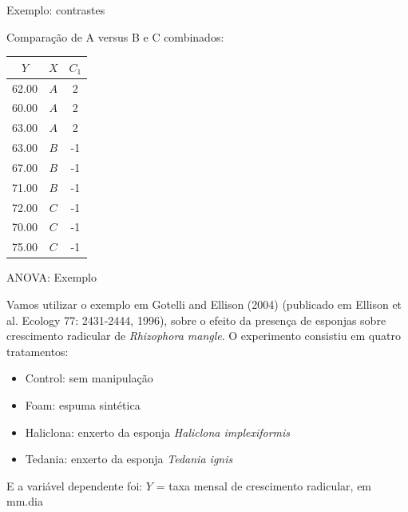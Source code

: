 \documentclass{beamer}\usepackage[]{graphicx}\usepackage[]{color}
\begin{document}
\begin{frame}{Exemplo: contrastes}

Comparação de A versus B e C combinados:

\begin{tabular}{cc|c}
  \hline
  $Y$ & $X$ & $C_1$  \\ 
  \hline
  62.00 & $A$ & 2 \\ 
  60.00 & $A$ & 2 \\ 
  63.00 & $A$ & 2 \\ 
  63.00 & $B$ & -1 \\ 
  67.00 & $B$ & -1 \\ 
  71.00 & $B$ & -1 \\ 
  72.00 & $C$ & -1\\ 
  70.00 & $C$ & -1\\ 
  75.00 & $C$ & -1\\ 
  \hline
\end{tabular}

\end{frame}


\begin{frame}{ANOVA: Exemplo}

Vamos utilizar o exemplo em Gotelli and Ellison (2004) (publicado em Ellison et al. Ecology 77: 2431-2444, 1996), sobre o efeito da presença de esponjas sobre crescimento radicular de \emph{Rhizophora mangle}. \pause
\vfill
O experimento consistiu em quatro tratamentos: \pause
\vfill
\begin{itemize}
\item Control: sem manipulação \pause
\item Foam: espuma sintética \pause
\item Haliclona: enxerto da esponja \emph{Haliclona implexiformis} \pause
\item Tedania: enxerto da esponja \emph{Tedania ignis} \pause
\end{itemize}

E a variável dependente foi: $Y$ = taxa mensal de crescimento radicular, em mm.dia

\end{frame}
\end{document}
